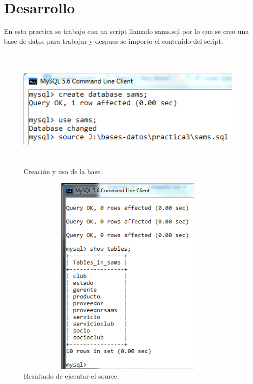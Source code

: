 \documentclass[12pt, titlepage]{article}
\begin{document}
    \section{Desarrollo}
        En esta practica se trabajo con un script llamado sams.sql por lo que se creo una base de datos para trabajar y despues se importo el contenido del script.
        \begin{figure}[H]
            \begin{center}
                \includegraphics[width=12cm, height=6cm]{img/source.png}
                \caption{Creación y uso de la base.}
                \label{fig:hasta-use}
            \end{center}
        \end{figure}
        \begin{figure}[H]
            \begin{center}
                \includegraphics[width=16cm, height=10cm]{img/post-source.png}
                \caption{Resultado de ejecutar el source.}
                \label{fig:tablas}
            \end{center}
        \end{figure}
\end{document}
